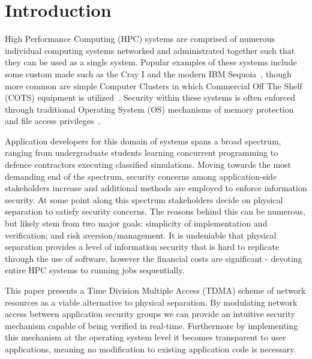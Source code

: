 \documentclass[oneside,12pt]{memoir}
\begin{document}
\tableofcontents

\listoffigures

\mainmatter
\pagestyle{asu} 

\chapter{Introduction}
High Performance Computing (HPC) systems are comprised of numerous individual computing systems networked and administrated together such that they can be used as a single system. Popular examples of these systems include some custom made such as the Cray I and the modern IBM Sequoia~\cite{leavitt2012big}, though more common are simple Computer Clusters in which Commercial Off The Shelf (COTS) equipment is utilized~\cite{buyya1999high}. Security within these systems is often enforced through traditional Operating System (OS) mechanisms of memory protection and file access privileges~\cite{buyya1999high}. 



Application developers for this domain of systems spans a broad spectrum, ranging from undergraduate students learning concurrent programming to defence contractors executing classified simulations. Moving towards the most demanding end of the spectrum, security concerns among application-side stakeholders increase and additional methods are employed to enforce information security. At some point along this spectrum stakeholders decide on physical separation to satisfy security concerns. The reasons behind this can be numerous, but likely stem from two major goals: simplicity of implementation and verification; and risk aversion/management. It is undeniable that physical separation provides a level of information security that is hard to replicate through the use of software, however the financial costs are significant - devoting entire HPC systems to running jobs sequentially. 


This paper presents a Time Division Multiple Access (TDMA) scheme of network resources as a viable alternative to physical separation. By modulating network access between application security groups we can provide an intuitive security mechanism capable of being verified in real-time. Furthermore by implementing this mechanism at the operating system level it becomes transparent to user applications, meaning no modification to existing application code is necessary. 
\end{document}
